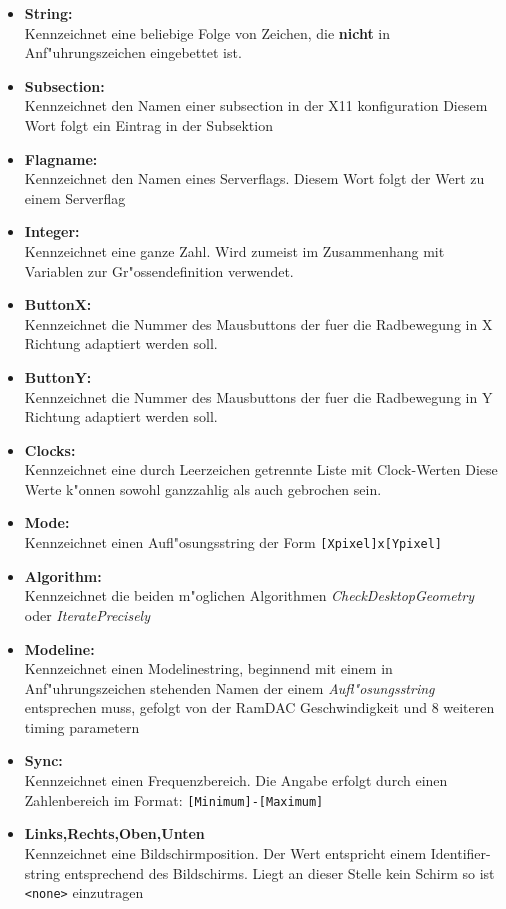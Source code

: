 \begin{itemize}
\item \textbf{String:}\\
Kennzeichnet eine beliebige Folge von Zeichen, die \textbf{nicht}
in Anf"uhrungszeichen eingebettet ist.
\item \textbf{Subsection:}\\
Kennzeichnet den Namen einer subsection in der X11 konfiguration
Diesem Wort folgt ein Eintrag in der Subsektion
\item \textbf{Flagname:}\\
Kennzeichnet den Namen eines Serverflags. Diesem Wort folgt der
Wert zu einem Serverflag
\item \textbf{Integer:}\\
Kennzeichnet eine ganze Zahl. Wird zumeist im Zusammenhang 
mit Variablen zur Gr"ossendefinition verwendet.
\item \textbf{ButtonX:}\\
Kennzeichnet die Nummer des Mausbuttons der fuer die Radbewegung
in X Richtung adaptiert werden soll.
\item \textbf{ButtonY:}\\
Kennzeichnet die Nummer des Mausbuttons der fuer die Radbewegung
in Y Richtung adaptiert werden soll.
\item \textbf{Clocks:}\\
Kennzeichnet eine durch Leerzeichen getrennte Liste mit Clock-Werten  
Diese Werte k"onnen sowohl ganzzahlig als auch gebrochen sein. 
\item \textbf{Mode:}\\
Kennzeichnet einen Aufl"osungsstring der Form \verb+[Xpixel]x[Ypixel]+
\item \textbf{Algorithm:}\\
Kennzeichnet die beiden m"oglichen Algorithmen
\textit{CheckDesktopGeometry} oder \textit{IteratePrecisely}
\item \textbf{Modeline:}\\
Kennzeichnet einen Modelinestring, beginnend mit einem in 
Anf"uhrungszeichen stehenden Namen der einem \textit{Aufl"osungsstring}
entsprechen muss, gefolgt von der RamDAC Geschwindigkeit und 8 weiteren 
timing parametern
\item \textbf{Sync:}\\
Kennzeichnet einen Frequenzbereich. Die Angabe erfolgt durch einen 
Zahlenbereich im Format: \verb+[Minimum]-[Maximum]+ 
\item \textbf{Links,Rechts,Oben,Unten}\\
Kennzeichnet eine Bildschirmposition. Der Wert entspricht einem 
Identifier-string entsprechend des Bildschirms. Liegt an dieser
Stelle kein Schirm so ist \verb+<none>+ einzutragen
\end{itemize}

